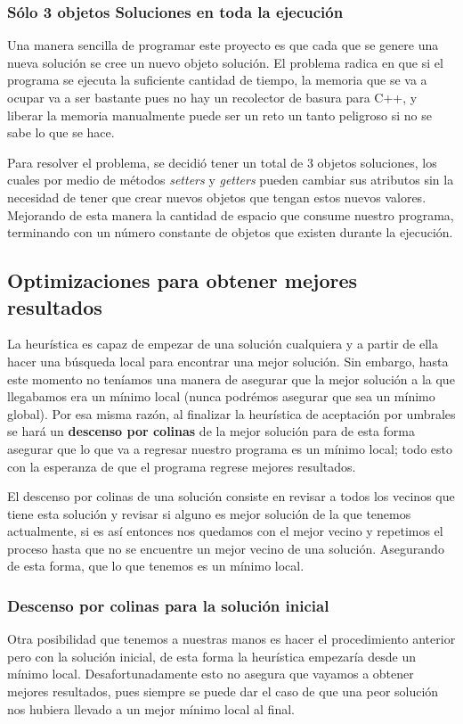 \documentclass{article}
\newcommand{\tbf}[1]{\textbf{#1}}
\newcommand{\tit}[1]{\textit{#1}}
\begin{document}
  \subsubsection{Sólo 3 objetos Soluciones en toda la ejecución}
  Una manera sencilla de programar este proyecto es que cada 
  que se genere una nueva solución se cree un nuevo objeto 
  solución. El problema radica en que si el programa se ejecuta 
  la suficiente cantidad de tiempo, la memoria que se va a 
  ocupar va a ser bastante pues no hay un recolector de basura 
  para C++, y liberar la memoria manualmente puede ser un reto 
  un tanto peligroso si no se sabe lo que se hace.

  Para resolver el problema, se decidió tener un total de 
  3 objetos soluciones, los cuales por medio de métodos
  \tit{setters} y \tit{getters} pueden cambiar sus atributos 
  sin la necesidad de tener que crear nuevos objetos
  que tengan estos nuevos valores. Mejorando de esta manera
  la cantidad de espacio que consume nuestro programa, terminando 
  con un número constante de objetos que existen durante la 
  ejecución.

  \subsection{Optimizaciones para obtener mejores resultados}
  La heurística es capaz de empezar de una solución cualquiera
  y a partir de ella hacer una búsqueda local para encontrar 
  una mejor solución. Sin embargo, hasta este momento no teníamos
  una manera de asegurar que la mejor solución a la que llegabamos 
  era un mínimo local (nunca podrémos asegurar que sea un mínimo 
  global). Por esa misma razón, al finalizar la heurística de 
  aceptación por umbrales se hará un \tbf{descenso por colinas}
  de la mejor solución para de esta forma asegurar que lo que 
  va a regresar nuestro programa es un mínimo local; todo 
  esto con la esperanza de que el programa regrese mejores 
  resultados.

  El descenso por colinas de una solución consiste en revisar a
  todos los vecinos que tiene esta solución y revisar si alguno
  es mejor solución de la que tenemos actualmente, si es así 
  entonces nos quedamos con el mejor vecino y repetimos el 
  proceso hasta que no se encuentre un mejor vecino de una 
  solución. Asegurando de esta forma, que lo que tenemos es 
  un mínimo local.

  \subsubsection{Descenso por colinas para la solución inicial}
  Otra posibilidad que tenemos a nuestras manos es hacer el 
  procedimiento anterior pero con la solución inicial, de 
  esta forma la heurística empezaría desde un mínimo local.
  Desafortunadamente esto no asegura que vayamos a obtener 
  mejores resultados, pues siempre se puede dar el caso de que 
  una peor solución nos hubiera llevado a un mejor mínimo local
  al final.
\end{document}
